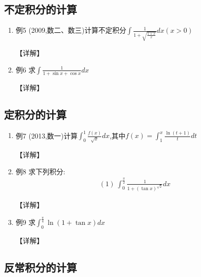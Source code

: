 \documentclass[12pt, a4paper, oneside, UTF8]{ctexbook}
\begin{document}
\subsection{ 不定积分的计算}

\begin{enumerate}[label=\arabic*.,start=4]
    \item 例5 (2009,数二、数三)计算不定积分$\int\frac{1}{1+\sqrt{\frac{1+x}{x}}}dx(x>0)$
    
    \begin{solution}
    【详解】
    \end{solution}
    
    \item 例6 求$\int\frac{1}{1+\sin x+\cos x} dx$
    
    \begin{solution}
    【详解】
    \end{solution}
\end{enumerate}

\subsection{ 定积分的计算}

\begin{enumerate}[label=\arabic*.,start=6]
    \item 例7 (2013,数一)计算$\int_0^1\frac{f(x)}{\sqrt{x}} dx$,其中$f(x)=\int_1^x\frac{\ln(t+1)}{t} dt$
    
    \begin{solution}
    【详解】
    \end{solution}
    
    \item 例8 求下列积分:
    \begin{align*}
        (1)\ \int_0^{\frac{\pi}{2}}\frac{1}{1+(\tan x)^{\sqrt{2}}} dx
    \end{align*}
    
    \begin{solution}
    【详解】
    \end{solution}
    
    \item 例9 求$\int_0^{\frac{\pi}{4}}\ln(1+\tan x) dx$
    
    \begin{solution}
    【详解】
    \end{solution}
\end{enumerate}

\subsection{ 反常积分的计算}
\end{document}
